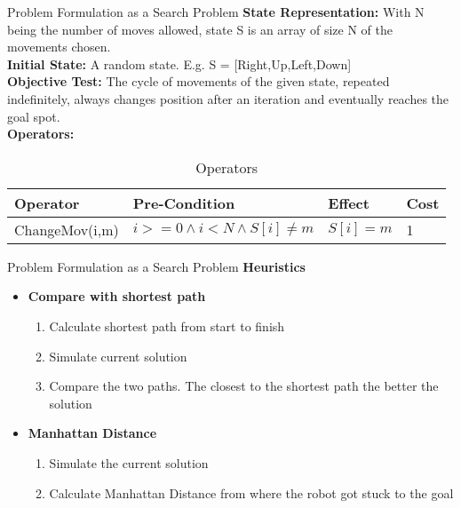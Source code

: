 

\begin{frame}{Problem Formulation as a Search Problem}
    \textbf{State Representation:} With N being the number of moves allowed, state S is an array of size N of the movements chosen. \\
    \textbf{Initial State:} A random state. E.g. S = [Right,Up,Left,Down] \\
    \textbf{Objective Test:} The cycle of movements of the given state, repeated indefinitely, always changes position after an iteration and eventually reaches the goal spot. \\
    \textbf{Operators:}
    \begin{table}
        \begin{tabular}{l l l l}
            \toprule
            \textbf{Operator} & \textbf{Pre-Condition} & \textbf{Effect} & \textbf{Cost} \\
            \midrule
            ChangeMov(i,m)  & $ i >= 0 \land i < N \land S[i] \neq m $ & $S[i] = m $  & 1 \\
            \bottomrule
        \end{tabular}
        \caption{Operators}
    \end{table}
\end{frame}


\begin{frame}{Problem Formulation as a Search Problem}
    \textbf{Heuristics}
    \begin{itemize}
        \item \textbf{Compare with shortest path}
        \begin{enumerate}
            \item Calculate shortest path from start to finish
            \item Simulate current solution 
            \item Compare the two paths. The closest to the shortest path the better the solution
        \end{enumerate}
        \item \textbf{Manhattan Distance}
        \begin{enumerate}
            \item Simulate the current solution
            \item Calculate Manhattan Distance from where the robot got stuck to the goal
        \end{enumerate}
    \end{itemize}
    
\end{frame}
